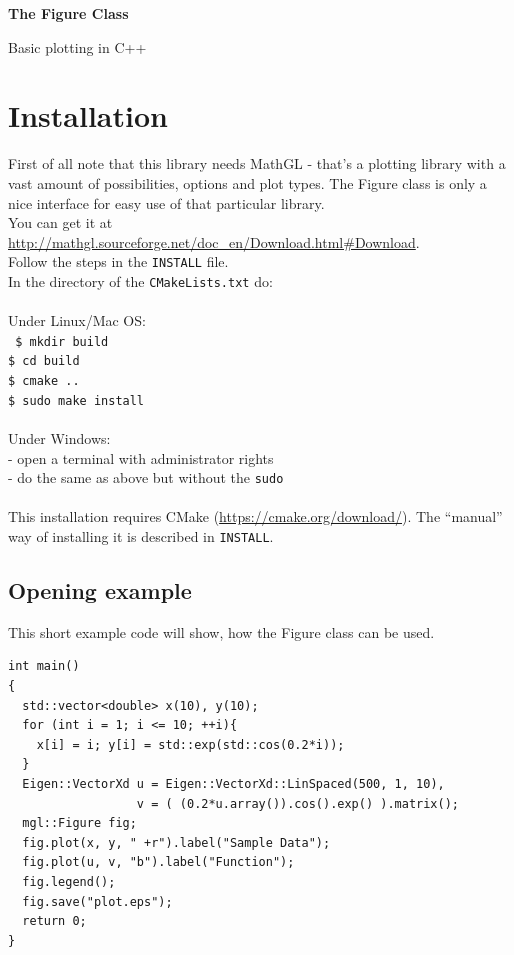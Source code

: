 \documentclass[a4paper]{article}
\begin{document}
\begin{center}
  \begin{huge}
    \textbf{The Figure Class\\}
  \end{huge}
  Basic plotting in C++
\end{center}
  
\vspace*{3cm}
  \tableofcontents
\vspace*{\fill}

\newpage
{}
\section{Installation}

First of all note that this library needs MathGL - that's a plotting library with a vast amount of possibilities, options and plot types.
The Figure class is only a nice interface for easy use of that particular library. \\
You can get it at \url{http://mathgl.sourceforge.net/doc_en/Download.html#Download}. \\

Follow the steps in the \texttt{INSTALL} file. \\
In the directory of the \texttt{CMakeLists.txt} do: \\ \\
Under Linux/Mac OS: \\
\texttt{
\indent   \$ mkdir build \\
\indent   \$ cd build \\
\indent   \$ cmake .. \\
\indent   \$ sudo make install \\ \\
}
Under Windows: \\
\indent    - open a terminal with administrator rights \\
\indent    - do the same as above but without the \texttt{sudo} \\ \\
%
This installation requires CMake (\url{https://cmake.org/download/}). 
The ``manual'' way of installing it is described in \texttt{INSTALL}.

\subsection{Opening example}

This short example code will show, how the Figure class can be used.
\begin{lstlisting}
int main()
{
  std::vector<double> x(10), y(10);
  for (int i = 1; i <= 10; ++i){ 
    x[i] = i; y[i] = std::exp(std::cos(0.2*i));
  }
  Eigen::VectorXd u = Eigen::VectorXd::LinSpaced(500, 1, 10),
                  v = ( (0.2*u.array()).cos().exp() ).matrix();
  mgl::Figure fig;
  fig.plot(x, y, " +r").label("Sample Data");
  fig.plot(u, v, "b").label("Function");
  fig.legend();
  fig.save("plot.eps");
  return 0;
}
\end{lstlisting}
\end{document}
